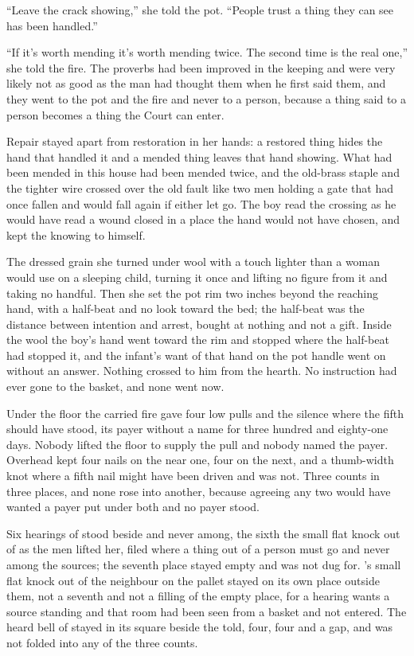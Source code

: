 “Leave the crack showing,” she told the pot. “People trust a thing they can see has been handled.”

“If it's worth mending it's worth mending twice. The second time is the real one,” she told the fire. The proverbs had been improved in the keeping and were very likely not as good as the man had thought them when he first said them, and they went to the pot and the fire and never to a person, because a thing said to a person becomes a thing the Court can enter.

Repair stayed apart from restoration in her hands: a restored thing hides the hand that handled it and a mended thing leaves that hand showing. What had been mended in this house had been mended twice, and the old-brass staple and the tighter wire crossed over the old fault like two men holding a gate that had once fallen and would fall again if either let go. The boy read the crossing as he would have read a wound closed in a place the hand would not have chosen, and kept the knowing to himself.

The dressed grain she turned under wool with a touch lighter than a woman would use on a sleeping child, turning it once and lifting no figure from it and taking no handful. Then she set the pot rim two inches beyond the reaching hand, with a half-beat and no look toward the bed; the half-beat was the distance between intention and arrest, bought at nothing and not a gift. Inside the wool the boy's hand went toward the rim and stopped where the half-beat had stopped it, and the infant's want of that hand on the pot handle went on without an answer. Nothing crossed to him from the hearth. No instruction had ever gone to the basket, and none went now.

\scenebreak

Under the floor the carried fire gave four low pulls and the silence where the fifth should have stood, its payer without a name for three hundred and eighty-one days. Nobody lifted the floor to supply the pull and nobody named the payer. Overhead  kept four nails on the near one, four on the next, and a thumb-width knot where a fifth nail might have been driven and was not. Three counts in three places, and none rose into another, because agreeing any two would have wanted a payer put under both and no payer stood.

Six hearings of  stood beside and never among, the sixth the small flat knock out of  as the men lifted her, filed where a thing out of a person must go and never among the sources; the seventh place stayed empty and was not dug for. 's small flat knock out of the neighbour on the pallet stayed on its own place outside them, not a seventh and not a filling of the empty place, for a hearing wants a source standing and that room had been seen from a basket and not entered. The heard bell of  stayed in its square beside the told, four, four and a gap, and was not folded into any of the three counts.

